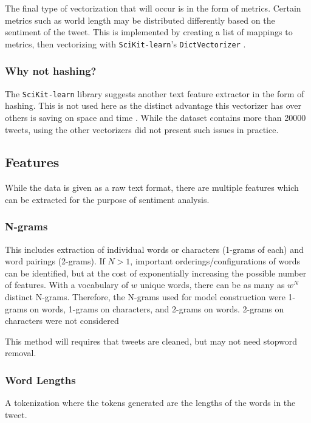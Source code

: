 \documentclass[11pt]{article}
\begin{document}
The final type of vectorization that will occur is in the form of metrics. 
Certain metrics such as world length may be distributed differently based on the sentiment of the tweet.
This is implemented by creating a list of mappings to metrics, then vectorizing with \texttt{SciKit-learn}'s \texttt{DictVectorizer} \cite{skl}.

\subsubsection{Why not hashing?}

The \texttt{SciKit-learn} library suggests another text feature extractor in the form of hashing.
This is not used here as the distinct advantage this vectorizer has over others is saving on space and time \cite{skl}.
While the dataset contains more than 20000 tweets, using the other vectorizers did not present such issues in practice.

\subsection{Features}\label{subsection:tokens}

While the data is given as a raw text format, there are multiple features which can be extracted for the purpose of sentiment analysis.

\subsubsection{N-grams}

This includes extraction of individual words or characters (1-grams of each) and word pairings (2-grams).
If $N > 1$, important orderings/configurations of words can be identified, but at the cost of exponentially increasing the possible number of features.
With a vocabulary of $w$ unique words, there can be as many as $w^N$ distinct N-grams.
Therefore, the N-grams used for model construction were 1-grams on words, 1-grams on characters, and 2-grams on words.
2-grams on characters were not considered 

This method will requires that tweets are cleaned, but may not need stopword removal.

\subsubsection{Word Lengths}

A tokenization where the tokens generated are the lengths of the words in the tweet.
\end{document}

